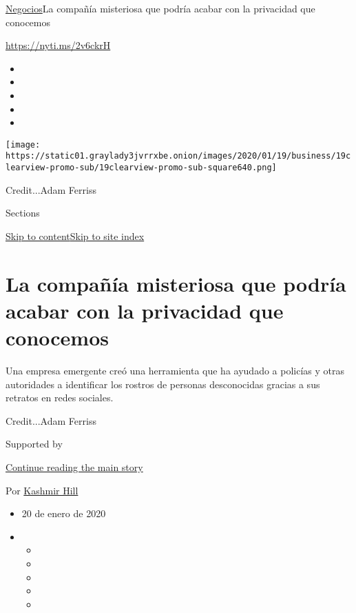 \href{/es/section/negocios}{Negocios}\textbar{}La compañía misteriosa
que podría acabar con la privacidad que conocemos

\href{https://nyti.ms/2v6ckrH}{https://nyti.ms/2v6ckrH}

\begin{itemize}
\item
\item
\item
\item
\item
\end{itemize}

\texttt{[image: https://static01.graylady3jvrrxbe.onion/images/2020/01/19/business/19clearview-promo-sub/19clearview-promo-sub-square640.png]}

Credit...Adam Ferriss

Sections

\protect\hyperlink{site-content}{Skip to
content}\protect\hyperlink{site-index}{Skip to site index}

\hypertarget{la-compauxf1uxeda-misteriosa-que-podruxeda-acabar-con-la-privacidad-que-conocemos}{%
\section{La compañía misteriosa que podría acabar con la privacidad que
conocemos}\label{la-compauxf1uxeda-misteriosa-que-podruxeda-acabar-con-la-privacidad-que-conocemos}}

Una empresa emergente creó una herramienta que ha ayudado a policías y
otras autoridades a identificar los rostros de personas desconocidas
gracias a sus retratos en redes sociales.

Credit...Adam Ferriss

Supported by

\protect\hyperlink{after-sponsor}{Continue reading the main story}

Por \href{https://www.nytimes3xbfgragh.onion/by/kashmir-hill}{Kashmir
Hill}

\begin{itemize}
\item
  20 de enero de 2020
\item
  \begin{itemize}
  \item
  \item
  \item
  \item
  \item
  \end{itemize}
\end{itemize}

